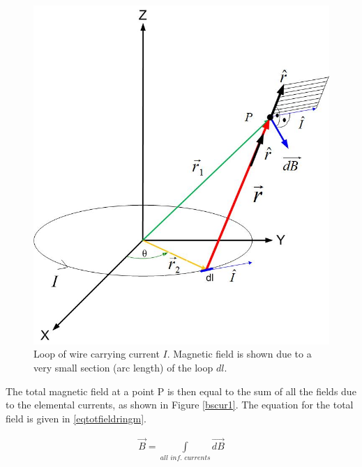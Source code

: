 \documentclass{ximera}
\begin{document}
\begin{figure}[htbp]
\begin{center}
\includegraphics[scale=0.3]{../jpg/magfieldloop.jpg}
\end{center}
\caption{Loop of wire carrying current $I$. Magnetic  field is shown due to a very small section (arc length) of the loop $dl$.}
\label{fig:magfield}
\end{figure}

The total magnetic field at a point P is then equal to the sum of all the fields due to the elemental currents, as shown in Figure \ref{bscur1}. The equation for the total field is given in \ref{eqtotfieldringm}. 

\begin{eqnarray}
\vec{B}=\int\limits_{all \,\, inf. \,\, currents} \vec{dB} \label{eqtotfieldringm}
\end{eqnarray}
\end{document}
